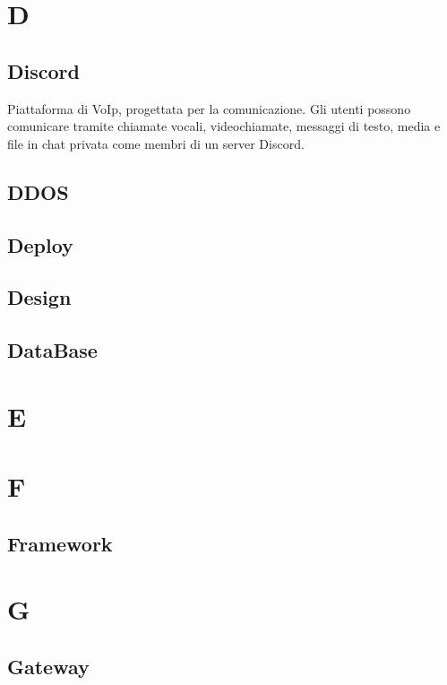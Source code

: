 \documentclass{classes/base}
\begin{document}
        \newpage  
    \section*{D}
       
        \subsection*{Discord}
        Piattaforma di VoIp, progettata per la comunicazione. Gli utenti possono comunicare tramite chiamate vocali, videochiamate, messaggi di testo, media e file in chat privata come membri di un server Discord.

        \subsection*{DDOS}

        \subsection*{Deploy}

        \subsection*{Design}

        \subsection*{DataBase}
        \newpage  
    \section*{E}
    \newpage  
    \section*{F}
        \subsection*{Framework}
        \newpage  
    \section*{G}
        
        \subsection*{Gateway}
\end{document}
